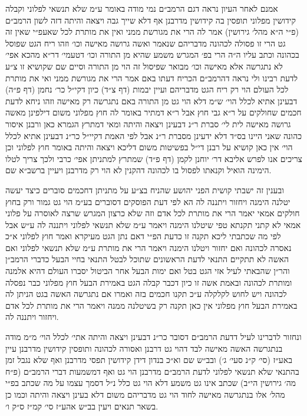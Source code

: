 \documentclass[12pt, openany]{book}
\begin{document}
\begin{multicols}{2}
אמנם לאחר העיון נראה דגם הרמב״ם נמי מודה באומר ע״מ שלא תנשאי לפלוני וקבלה קידושין מפלוני תופסין בה קידושין מדרבנן אף דלא שייך גבה ויצאה והיתה דזה לשון הרמב״ם (פ״י ה״א מהל׳ גירושין) אמר לה הרי את מגורשת ממני ואין את מותרת לכל שאעפ״י שאין זה גט הרי זו פסולה לכהונה מדבריהם שנאמר ואשה גרושה מאישה וכו׳ וזהו ריח הגט שפוסל בכהונה וכתב עליו ה״ה הרי בפ׳ המגרש משמע שהיא מן התורה וכו׳ דטעמי׳ דר״א מהכא אפי׳ לא נתגרשה אלא מאישה וכו׳ מבואר שפיסול זה הוי מן התורה וסיים שם שקושיא זו צ״ע לדעת רבינו ולי נראה דהרמב״ם הכריח דעתו באם אמר הרי את מגורשת ממני ואי את מותרת לכל העולם הוי רק ריח הגט מדבריהם ועיין יבמות (דף צ״ד) כיון דקי״ל כר׳ נחמן (דף פ״ה) דבעינן אתיא לכלל הוי׳ ש״מ דלא הוי גט מן התורה באם נתגרשה רק מאישה וזהו ניחא לדעת חכמים שחולקים על ר״א גבי חוץ אבל ר״א דמתיר באומר לה חוץ מפלוני משום דילפינן מאשה גרושה מאישה לית לי׳ סברת ר״נ דבעינן ויצאה והיתה ומאי דמתרץ הגמרא כאן ורבנן איסור כהונה שאני היינו בס״ד דלא ידעינן מסברת ר״נ אבל לפי האמת דקיי״ל כר״נ דבעינן אתיא לכלל הוי׳ אין כאן קושיא על רבנן די״ל בפשיטות משום דליכא ויצאה והיתה באומר חוץ לפלוני וכן צריכים אנו לפרש אליבא דר׳ יוחנן לקמן (דף פ״ד) שמתרץ למתניתן אפי׳ כרבי ולכך צריך לטלו הימינה הואיל וקנאתו לפסול בו לכהונה דהקנין לא הוי רק מדרבנן ויעיין ברשב״א שם.\\\vspace{0pt}

ובענין זה ישבתי קושית הפני יהושע שהניח בצ״ע על מתניתן דחכמים סוברים כיצד יעשה יטלנה הימנה ויחזור ויתננה לה הא לפי דעת הפוסקים דסוברים בע״מ הוי גט גמור ורק בחוץ חולקים אמאי יאמר הרי את מותרת לכל אדם וזה שלא כרצון המגרש שרצה לאוסרה על פלוני אמאי לא קתני תקנתא טפי שיטלנו הימנה ויאמר ע״מ שלא תנשאי לפלוני ויתננה לה ע״ש אבל לפי מה שכתבתי ליכא תקנה זו כדעת הפ״י דאם נתן הגט מעיקרא ואמר חוץ לפלוני א״כ נאסרה לכהונה ואם יחזור ויטלנו הימנה ויאמר הרי את מותרת ע״מ שלא תנשאי לפלוני ואם האשה לא תתקיים התנאי לדעת הראשונים שתוכל לבטל התנאי בחיי הבעל כדברי הרמב״ן והר״ן שהבאתי לעיל אזי הגט בטל ואם ימות הבעל אחר הביטול יסברו העולם דהיא אלמנה ומותרת לכהונה ובאמת אשה זו כיון דכבר קבלה הגט באמירת הבעל חוץ מפלוני כבר נפסלה לכהונה ויש לחוש לקלקלה ע״כ תקנו חכמים בזה ואמרו אם נתגרשה האשה בגט הניתן לה באמירת הבעל חוץ מפלוני אין כאן תקנה רק בשיטלנה ממנה ויאמר הרי את מותרת לכל אדם ויחזור ויתננה לה.\\\vspace{0pt}

ונחזור לדברינו לעיל דדעת הרמב״ם דסובר כר״נ דבעינן ויצאה והיתה אתי׳ לכלל הוי׳ מ״מ מודה בנתגרשה האשה מאישה לבד דהוי גט דרבנן ואסורה לכהונה ותופסין קידושין מדרבנן עיין באע״ז (סי׳ ק״נ סעי׳ ג׳) ובב״ש שם וא״כ בנדון דידן קידושין תפסי מדרבנן ואף שלא נגבל זמן בהתנאי שלא תנשאי לפלוני לדעת הרמב״ם מדרבנן הוי גט ואף דמשמעות דברי הרמב״ם (פ״ח מה׳ גירושין הי״ב) שכתב אינו גט משמע דלא הוי גט כלל נ״ל דסמך עצמו על מה שכתב בפ״י מהל׳ אלו בנתגרשה מאישה לחוד הוי גט מדבריהם משום דלא בעינן ויצאה והיתה וכמו כן בשאר תנאים ויעין בב״ש אהע״ז סי׳ קמ״ז ס״ק ו׳.\\\vspace{0pt}


\end{multicols}
\end{document}
